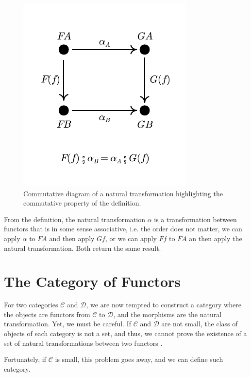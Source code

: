 \begin{figure}[H]
	\begin{center}
		\includegraphics{./notebooks/NaturalTransformation.pdf}
	\end{center}
	\caption{Commutative diagram of a natural transformation highlighting the commutative property of the definition.}
	\label{fig:NaturalTransformation}
\end{figure}

From the definition, the natural transformation $\alpha$ is a transformation between functors
that is in some sense associative, i.e. the order does not matter, we can apply $\alpha$
to $FA$ and then apply $Gf$, or we can apply $Ff$ to $FA$ an then apply the natural transformation. Both
return the same result.

\section{The Category of Functors}

For two categories $\mathcal C$ and $\mathcal D$, we are now tempted to construct a category
where the objects are functors from $\mathcal C$ to $\mathcal D$, and the
morphisms are the natural transformation.
Yet, we must be careful. If $\mathcal C$ and $\mathcal D$ are not small, the
class of objects of each category is not a set, and thus, we cannot
prove the existence of a set of natural transformations between
two functors \citep{borceux1994handbook}.

Fortunately, if $\mathcal C$ is small, this problem goes away, and
we can define such category.

